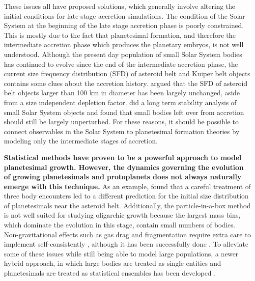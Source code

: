 These issues all have proposed solutions, which generally involve altering the initial conditions for late-stage
accretion simulations. The condition of the Solar System at the beginning of the late stage accretion phase is poorly constrained. 
This is mostly due to the fact that planetesimal formation, and therefore the intermediate accretion phase which produces the 
planetary embryos, is not well understood. Although the present day population of small Solar System bodies has continued to 
evolve since the end of the intermediate accretion phase, the current size frequency distribution (SFD) of asteroid belt and 
Kuiper belt objects contains some clues about the accretion history. \cite{morbidelli09} argued that the SFD of asteroid belt 
objects larger than 100 km in diameter has been largely unchanged, aside from a size independent depletion factor. 
\cite{duncan89} did a long term stability analysis of small Solar System objects and found that small bodies left over from 
accretion should still be largely unperturbed. For these reasons, it should be possible to connect observables in the Solar System to planetesimal formation theories by modeling only the intermediate stages of accretion.

\textbf{Statistical methods \cite{greenbern78, wetherill89} have proven to be a powerful approach to model planetesimal growth. However, the dynamics governing the evolution of growing planetesimals and protoplanets does not always naturally emerge with this technique.} As an example, 
\cite{weidenschilling11} found that a careful treatment of three body encounters led to a different prediction for the initial size 
distribution of planetesimals near the asteroid belt. Additionally, the particle-in-a-box method is not well suited for studying 
oligarchic growth because the largest mass bins, which dominate the evolution in this stage, contain small numbers of bodies. 
Non-gravitational effects such as gas drag and fragmentation require extra care to implement self-consistently 
\cite{leinhardt08}, although it has been successfully done \cite{wetherill93, chambers01}. To alleviate some of these issues 
while still being able to model large populations, a newer hybrid approach, in which large bodies are treated as single entities 
and planetesimals are treated as statistical ensembles has been developed 
\cite{weidenschilling97, kenyon06, levison12, morishima15}.

